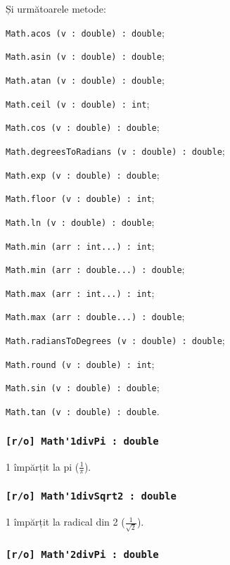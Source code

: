 Și următoarele metode:
\begin{icItems}
	\item \lstinline|Math.acos (v : double) : double|;
	\item \lstinline|Math.asin (v : double) : double|;
	\item \lstinline|Math.atan (v : double) : double|;
	\item \lstinline|Math.ceil (v : double) : int|;
	\item \lstinline|Math.cos (v : double) : double|;
	\item \lstinline|Math.degreesToRadians (v : double) : double|;
	\item \lstinline|Math.exp (v : double) : double|;
	\item \lstinline|Math.floor (v : double) : int|;
	\item \lstinline|Math.ln (v : double) : double|;
	\item \lstinline|Math.min (arr : int...) : int|;
	\item \lstinline|Math.min (arr : double...) : double|;
	\item \lstinline|Math.max (arr : int...) : int|;
	\item \lstinline|Math.max (arr : double...) : double|;
	\item \lstinline|Math.radiansToDegrees (v : double) : double|;
	\item \lstinline|Math.round (v : double) : int|;
	\item \lstinline|Math.sin (v : double) : double|;
	\item \lstinline|Math.tan (v : double) : double|.
\end{icItems}

\subsubsection{\lstinline|[r/o] Math'1divPi : double|}

1 împărțit la pi ($\frac{1}{\pi}$).

\subsubsection{\lstinline|[r/o] Math'1divSqrt2 : double|}

1 împărțit la radical din 2 ($\frac{1}{\sqrt{2}}$).

\subsubsection{\lstinline|[r/o] Math'2divPi : double|}

